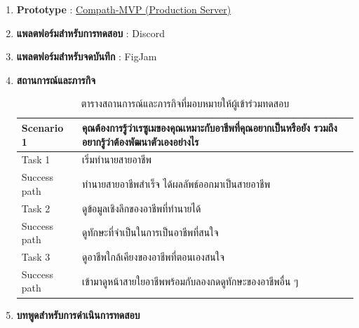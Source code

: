 \begin{enumerate}
    \item \textbf{Prototype} : \href{https://compath-cpe.web.app/}{Compath-MVP (Production Server)}
    \item \textbf{แพลตฟอร์มสำหรับการทดสอบ} : Discord
    \item \textbf{แพลตฟอร์มสำหรับจดบันทึก} : FigJam
    \item \textbf{สถานการณ์และภารกิจ}
          \begin{table}[H]
              \caption{ตารางสถานการณ์และภารกิจที่มอบหมายให้ผู้เข้าร่วมทดสอบ}
              \label{tab:scenarioUT}
              \begin{tabularx}{\textwidth}{|l|X|}
                  \hline
                  \textbf{Scenario 1} & \textbf{คุณต้องการรู้ว่าเรซูเมของคุณเหมาะกับอาชีพที่คุณอยากเป็นหรือยัง รวมถึงอยากรู้ว่าต้องพัฒนาตัวเองอย่างไร} \\ \hline
                  Task 1              & เริ่มทำนายสายอาชีพ                                                                          \\ \hline
                  Success path        & ทำนายสายอาชีพสำเร็จ ได้ผลลัพธ์ออกมาเป็นสายอาชีพ                                                  \\ \hline
                  Task 2              & ดูข้อมูลเชิงลึกของอาชีพที่ทำนายได้                                                                \\ \hline
                  Success path        & ดูทักษะที่จำเป็นในการเป็นอาชีพที่สนใจ                                                             \\ \hline
                  Task 3              & ดูอาชีพใกล้เคียงของอาชีพที่ตอนเองสนใจ                                                          \\ \hline
                  Success path        & เข้ามาดูหน้าสายใยอาชีพพร้อมกับลองกดดูทักษะของอาชีพอื่น ๆ                                           \\ \hline
              \end{tabularx}
          \end{table}
    \item \textbf{บทพูดสำหรับการดำเนินการทดสอบ}
          \begin{figure}[H]\centering

\end{figure}
\end{enumerate}
